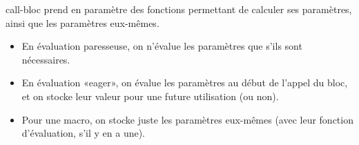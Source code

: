 \documentclass{article}
\begin{document}
{call-bloc prend en paramètre des fonctions permettant de calculer ses paramètres, ainsi que les paramètres eux-mêmes.
\begin{itemize}
\item En évaluation paresseuse, on n'évalue les paramètres que s'ils sont nécessaires.
\item En évaluation «eager», on évalue les paramètres au début de l'appel du bloc, et on stocke leur valeur pour une future utilisation (ou non).
\item Pour une macro, on stocke juste les paramètres eux-mêmes (avec leur fonction d'évaluation, s'il y en a une).
\end{itemize}
}
\end{document}
